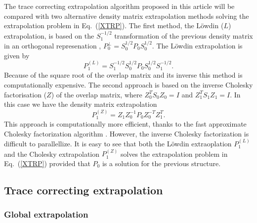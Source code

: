 \documentclass[twocolumn,showpacs,preprintnumbers,amsmath,amssymb]{revtex4}
\begin{document}
The trace correcting extrapolation algorithm proposed in this article will be compared with two 
alternative density matrix extrapolation methods solving the extrapolation problem in 
Eq.\ (\ref{XTRP}). The first method, 
the L\"{o}wdin ($L$) extrapolation, is based on the $S_1^{-1/2}$ transformation of the previous 
density matrix in an orthogonal represenation \cite{Lowdin}, $P_0^{\perp} = S_0^{1/2} P_0 S_0^{1/2}$. 
The L\"{o}wdin extrapolation is given by
\begin{equation}\label{Low}
P_1^{(L)} = S_1^{-1/2} S_0^{1/2} P_0 S_0^{1/2} S_1^{-1/2}.
\end{equation}
Because of the square root of the overlap matrix and its inverse this method is 
computationally expensive.
The second approach is based on the inverse Cholesky factorisation ($Z$) of the overlap matrix, where
$Z_0^TS_0Z_0 = I$ and $Z_1^TS_1Z_1 = I$.
In this case we have the density matrix extrapolation
\begin{equation}\label{IC}
P_1^{(Z)} = Z_1 Z_0^{-1} P_0 Z_0^{-T} Z_1^{T}.
\end{equation}
This approach is computationally more efficient, thanks to the fast approximate Cholesky factorization
algorithm \cite{Benzi96,Challa99}. However, the inverse Cholesky factorization is difficult to
parallellize.
It is easy to see that both the L\"{o}wdin extraoplation $P_1^{(L)}$ and 
the Cholesky extrapolation $P_1^{(Z)}$ solves the extrapolation problem in Eq.\ (\ref{XTRP})
provided that $P_0$ is a solution for the previous structure. 

\subsection{Trace correcting extrapolation}

\subsubsection{Global extrapolation}
\end{document}

